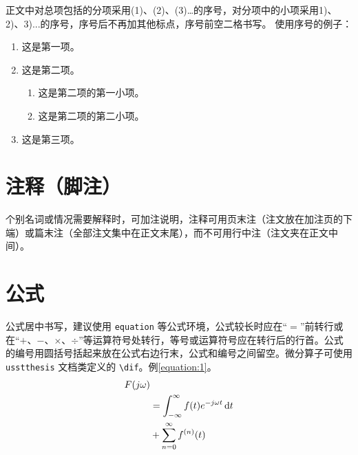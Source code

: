 正文中对总项包括的分项采用(1)、(2)、(3)…的序号，对分项中的小项采用1)、2)、3)...的序号，序号后不再加其他标点，序号前空二格书写。
使用序号的例子：
\begin{enumerate}
    \renewcommand{\arraystretch}{1.0}
    \item 这是第一项。
    \item 这是第二项。
    \begin{enumerate}
        \item 这是第二项的第一小项。
        \item 这是第二项的第二小项。
    \end{enumerate}
    \item 这是第三项。
\end{enumerate}

\section{注释（脚注）}
\par 个别名词或情况需要解释时，可加注说明，注释可用页末注（注文放在加注页的下端）或篇末注（全部注文集中在正文末尾），而不可用行中注（注文夹在正文中间）。

\section{公式}
\par 公式居中书写，建议使用 \lstinline|equation| 等公式环境，公式较长时应在“$=$”前转行或在“$+$、$-$、$\times$、$\div$”等运算符号处转行，等号或运算符号应在转行后的行首。公式的编号用圆括号括起来放在公式右边行末，公式和编号之间留空。微分算子可使用 \lstinline|usstthesis| 文档类定义的 \lstinline|\dif|。例\autoref{equation:1}。
\begin{equation}
    \label{equation:1}
    \begin{aligned}
F(j\omega) & \\
&=\int_{-\infty}^{\infty}f(t)e^{-j\omega t}\mathop{}\!\mathrm{d} t \\
&+\sum_{n=0}^{\infty} f^{(n)}(t)
    \end{aligned}
\end{equation}

